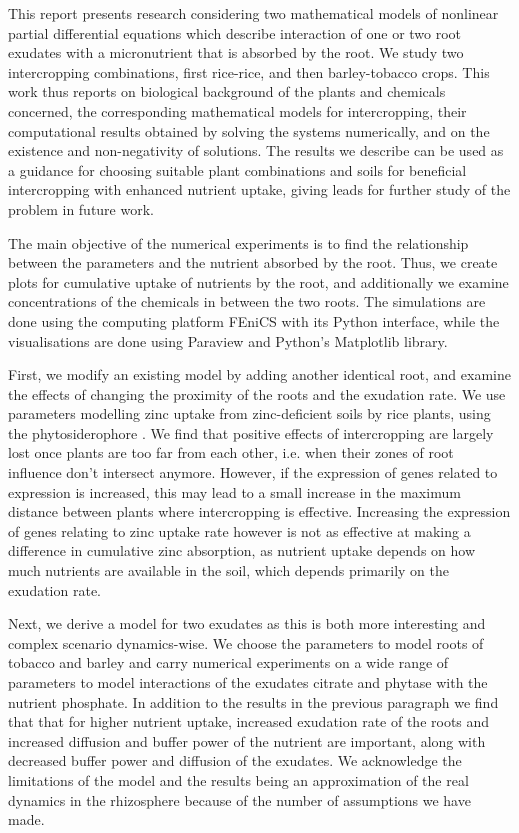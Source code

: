 \documentclass[11pt]{article}
\numberwithin{equation}{section}
\begin{document}
This report presents research considering two mathematical models of nonlinear partial differential equations which describe interaction of one or two root exudates with a micronutrient that is absorbed by the root. We study two intercropping combinations, first rice-rice, and then barley-tobacco crops. This work thus reports on biological background of the plants and chemicals concerned, the corresponding mathematical models for intercropping, their computational results obtained by solving the systems numerically, and on the existence and non-negativity of solutions. The results we describe can be used as a guidance for choosing suitable plant combinations and soils for beneficial intercropping with enhanced nutrient uptake, giving leads for further study of the problem in future work. 

The main objective of the numerical experiments is to find the relationship between the parameters and the nutrient absorbed by the root. Thus, we create plots for cumulative uptake of nutrients by the root, and additionally we examine concentrations of the chemicals in between the two roots. The simulations are done using the computing platform FEniCS with its Python interface, while the visualisations are done using Paraview and Python's Matplotlib library.

First, we modify an existing model by adding another identical root, and examine the effects of changing the proximity of the roots and the exudation rate. We use parameters modelling zinc uptake from zinc-deficient soils by rice plants, using the phytosiderophore . We find that positive effects of intercropping are largely lost once plants are too far from each other, i.e. when their zones of root influence don't intersect anymore.
However, if the expression of genes related to  expression is increased, this may lead to a small increase in the maximum distance between plants where intercropping is effective. Increasing the expression of genes relating to zinc uptake rate however is not as effective at making a difference in cumulative zinc absorption, as nutrient uptake depends on how much nutrients are available in the soil, which depends primarily on the exudation rate.

Next, we derive a model for two exudates as this is both more interesting and complex scenario dy\-na\-mics-wise. We choose the parameters to model roots of tobacco and barley and carry numerical experiments on a wide range of parameters to model interactions of the exudates citrate and phytase with the nutrient phosphate. In addition to the results in the previous paragraph we find that that for higher nutrient uptake, increased exudation rate of the roots and increased diffusion and buffer power of the nutrient are important, along with decreased buffer power and diffusion of the exudates. We acknowledge the limitations of the model and the results being an approximation of the real dynamics in the rhizosphere because of the number of assumptions we have made.
\end{document}
